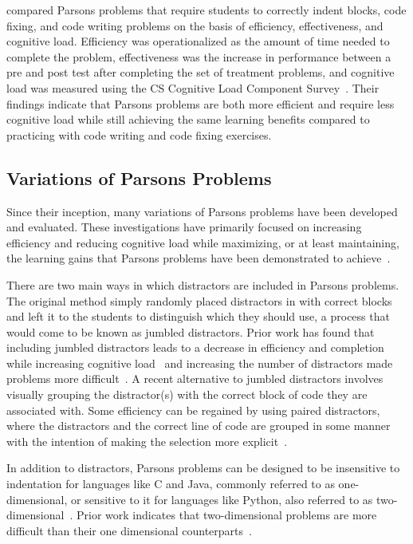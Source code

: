 \documentclass[]{acmart}
\begin{document}
\citet{ericson2017solving} compared Parsons problems that require students to
correctly indent blocks, code fixing, and code writing problems on the basis of
efficiency, effectiveness, and cognitive load. Efficiency was operationalized
as the amount of time needed to complete the problem, effectiveness was the
increase in performance between a pre and post test after completing the set of
treatment problems, and cognitive load was measured using the CS Cognitive Load
Component Survey~\cite{morrison2014measuring}. Their findings indicate that
Parsons problems are both more efficient and require less cognitive load while
still achieving the same learning benefits compared to practicing with code
writing and code fixing exercises.


\subsection{Variations of Parsons Problems}

Since their inception, many variations of Parsons problems have
been developed and evaluated. These investigations have primarily focused on
increasing efficiency and reducing cognitive load while maximizing, or at least
maintaining, the learning gains that Parsons problems have been demonstrated to
achieve~\cite{du2020review}.

There are two main ways in which distractors are included in Parsons problems.
The original method simply randomly placed distractors in with correct blocks
and left it to the students to distinguish which they should use, a process 
that would come to be known as jumbled distractors.
Prior work has found that including jumbled distractors leads to a decrease in
efficiency and completion while increasing cognitive
load~\cite{garner2007exploration, harms2016distractors} and increasing the
number of distractors made problems more difficult~\cite{ericson2015analysis}.
A recent alternative to jumbled distractors involves visually grouping the
distractor(s) with the correct block of code they are associated with.  Some
efficiency can be regained by using paired distractors, where the distractors
and the correct line of code are grouped in some manner with the intention of
making the selection more explicit~\cite{denny2008evaluating}.  

In addition to distractors, Parsons problems can be designed to be insensitive
to indentation for languages like C and Java, commonly referred to as
one-dimensional, or sensitive to it for languages like Python, also referred to
as two-dimensional~\cite{ihantola2011two}.  Prior work indicates that
two-dimensional problems are more difficult than their one dimensional
counterparts~\cite{ihantola2010open}. 
\end{document}
